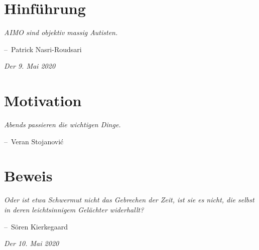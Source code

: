 \documentclass[oneside]{memoir}
\makeatletter
\newenvironment{chapquote}[2][2em]
  {\setlength{\@tempdima}{#1}%
   \def\chapquote@author{#2}%
   \parshape 1 \@tempdima \dimexpr\textwidth-2\@tempdima\relax%
   \itshape}
  {\par\normalfont\hfill--\ \chapquote@author\hspace*{\@tempdima}\par\bigskip}
\makeatother
\begin{document}
\chapter{Hinführung} %
\begin{chapquote}{Patrick Nasri-Roudsari}
\glqq AIMO sind objektiv massig Autisten.\grqq
\end{chapquote}
     \textit{Der 9. Mai 2020} \\
\chapter{Motivation} %
\begin{chapquote}{Veran Stojanović}
\glqq Abends passieren die wichtigen Dinge.\grqq
\end{chapquote}

\chapter{Beweis} %
\begin{chapquote}{Sören Kierkegaard}
\glqq Oder ist etwa Schwermut nicht das Gebrechen der Zeit, ist sie es nicht, die selbst in deren leichtsinnigem Gelächter widerhallt?\grqq
\end{chapquote}
     \textit{Der 10. Mai 2020} \\
     
     \bigskip \bigskip \bigskip \bigskip
     
\end{document}
